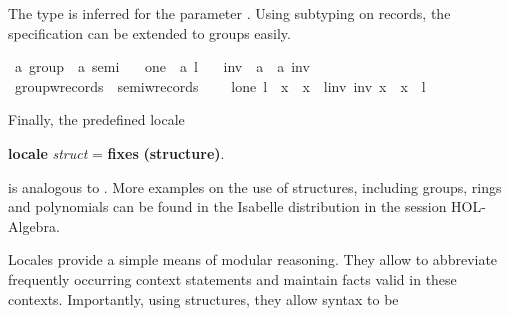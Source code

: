 \begin{isabellebody}
%
\begin{isamarkuptext}%
The type  is inferred for the parameter .  Using subtyping on records, the specification can be extended
  to groups easily.%
\end{isamarkuptext}%
\isamarkuptrue%
\ {\isacharprime}a\ group\ {\isacharequal}\ {\isachardoublequote}{\isacharprime}a\ semi{\isachardoublequote}\ {\isacharplus}\isanewline
\ \ one\ {\isacharcolon}{\isacharcolon}\ {\isachardoublequote}{\isacharprime}a{\isachardoublequote}\ {\isacharparenleft}{\isachardoublequote}l{\isasymindex}{\isachardoublequote}\ {}{}{}{\isacharparenright}\isanewline
\ \ inv\ {\isacharcolon}{\isacharcolon}\ {\isachardoublequote}{\isacharprime}a\ {\isasymRightarrow}\ {\isacharprime}a{\isachardoublequote}\ {\isacharparenleft}{\isachardoublequote}inv{\isasymindex}\ {\isacharunderscore}{\isachardoublequote}\ {\isacharbrackleft}{}{}{\isacharbrackright}\ {}{}{\isacharparenright}\isanewline
\isamarkupfalse%
\ group{\isacharunderscore}w{\isacharunderscore}records\ {\isacharequal}\ semi{\isacharunderscore}w{\isacharunderscore}records\ {\isacharplus}\isanewline
\ \ \ l{\isacharunderscore}one{\isacharcolon}\ {\isachardoublequote}l\ {\isasymbullet}\ x\ {\isacharequal}\ x{\isachardoublequote}\ \ l{\isacharunderscore}inv{\isacharcolon}\ {\isachardoublequote}inv\ x\ {\isasymbullet}\ x\ {\isacharequal}\ l{\isachardoublequote}\isamarkupfalse%
%
\begin{isamarkuptext}%
Finally, the predefined locale
\begin{center}
  \textbf{locale} \textit{struct} = \textbf{fixes} 
    \textbf{(structure)}.
\end{center}
  is analogous to .  
  More examples on the use of structures, including groups, rings and
  polynomials can be found in the Isabelle distribution in the
  session HOL-Algebra.%
\end{isamarkuptext}%
\isamarkuptrue%
%
\isamarkuptrue%
%
\begin{isamarkuptext}%
Locales provide a simple means of modular reasoning.  They allow to
  abbreviate frequently occurring context statements and maintain facts
  valid in these contexts.  Importantly, using structures, they allow syntax to be

\end{isamarkuptext}
\end{isabellebody}
